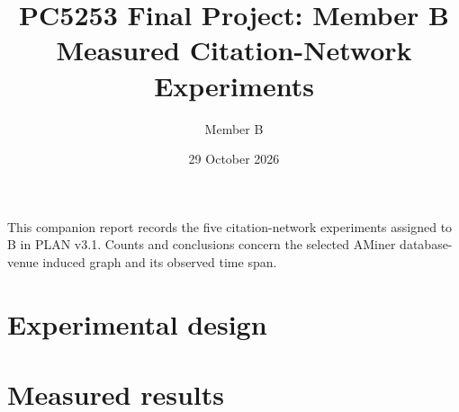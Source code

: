 \documentclass[11pt,a4paper]{article}
\title{PC5253 Final Project: Member B\\Measured Citation-Network Experiments}
\author{Member B}
\date{29 October 2026}
\begin{document}
\maketitle
\noindent This companion report records the five citation-network experiments
assigned to B in PLAN v3.1. Counts and conclusions concern the selected
AMiner database-venue induced graph and its observed time span.
\section{Experimental design}

\section{Measured results}

{\small}
\end{document}

